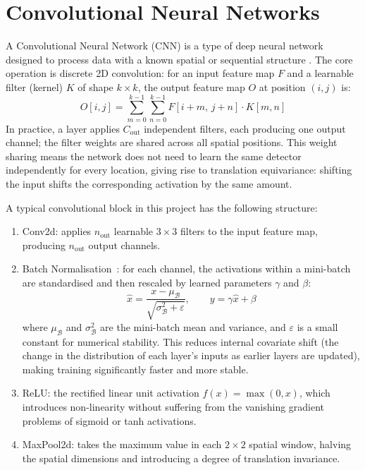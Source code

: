\section{Convolutional Neural Networks}\label{sec:meth_cnn}

A Convolutional Neural Network (CNN) is a type of deep neural network designed to process data with a known spatial or sequential structure \cite{lecun1998}. The core operation is discrete 2D convolution: for an input feature map $F$ and a learnable filter (kernel) $K$ of shape $k \times k$, the output feature map $O$ at position $(i,j)$ is:
\[
    O[i,j] = \sum_{m=0}^{k-1}\sum_{n=0}^{k-1} F[i+m,\, j+n]\cdot K[m,n]
\]
In practice, a layer applies $C_\text{out}$ independent filters, each producing one output channel; the filter weights are shared across all spatial positions. This weight sharing means the network does not need to learn the same detector independently for every location, giving rise to translation equivariance: shifting the input shifts the corresponding activation by the same amount.

A typical convolutional block in this project has the following structure:
\begin{enumerate}
    \item Conv2d: applies $n_\text{out}$ learnable $3\times3$ filters to the input feature map, producing $n_\text{out}$ output channels.
    \item Batch Normalisation~\cite{ioffe2015}: for each channel, the activations within a mini-batch are standardised and then rescaled by learned parameters $\gamma$ and $\beta$:
    \[
        \hat{x} = \frac{x - \mu_\mathcal{B}}{\sqrt{\sigma_\mathcal{B}^2 + \varepsilon}}, \qquad y = \gamma\hat{x} + \beta
    \]
    where $\mu_\mathcal{B}$ and $\sigma_\mathcal{B}^2$ are the mini-batch mean and variance, and $\varepsilon$ is a small constant for numerical stability. This reduces internal covariate shift (the change in the distribution of each layer's inputs as earlier layers are updated), making training significantly faster and more stable.
    \item ReLU: the rectified linear unit activation $f(x) = \max(0, x)$, which introduces non-linearity without suffering from the vanishing gradient problems of sigmoid or tanh activations.
    \item MaxPool2d: takes the maximum value in each $2\times2$ spatial window, halving the spatial dimensions and introducing a degree of translation invariance.
\end{enumerate}

